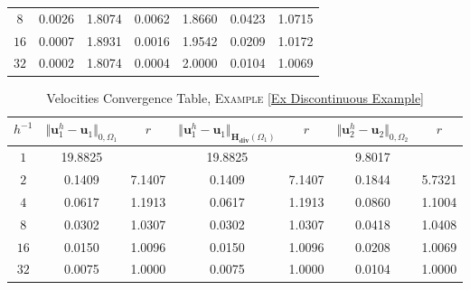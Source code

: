 \documentclass[3p]{elsarticle}
\def\uone{\mathbf{u}_{1}}
\def\utwo{\mathbf{u}_{2}}
\def\Hdiv{\mathbf{H_{div}}}
\begin{document}
\begin{example}
\begin{table}[h!]
\begin{center}
\begin{tabular}{ c c c c c c c }
$ 8 $  &  0.0026  & 1.8074 &  0.0062  & 1.8660    &  0.0423  & 1.0715  \\ 
%
$ 16 $  &  0.0007  & 1.8931 &  0.0016  & 1.9542   &  0.0209 & 1.0172   \\ 
%
$ 32 $  &  0.0002  &  1.8074  &  0.0004  & 2.0000  &  0.0104   & 1.0069  \\ 
%
    \hline
\end{tabular}
\end{center}
%
\end{table}
%
%
\begin{table*}[h!]
\caption{Velocities Convergence Table, \textsc{Example} \ref{Ex Discontinuous Example}}\label{Table Disc Velocity Approximation}
\def\arraystretch{1.4}
\begin{center}
\begin{tabular}{ c c c c c c c }
    \hline
    \rowcolor{gray!50}
$ h^{-1} $  
& $\Vert  \uone^{h}- \uone  \Vert_{ 0, \Omega_{1} } $ 
& $r$  
& $\Vert  \uone^{h}- \uone  \Vert_{\Hdiv(\Omega_{1})}$ 
& $r$
& $\Vert  \utwo^{h}- \utwo  \Vert_{ 0, \Omega_{2} } $ 
& $r$ \\ %
    \toprule
$ 1 $ &   19.8825 & &  19.8825  & &   9.8017  & \\
$ 2 $  &   0.1409  & 7.1407  &  0.1409  & 7.1407  &   0.1844 & 5.7321 \\
$ 4 $ &   0.0617  & 1.1913  &  0.0617  & 1.1913  &  0.0860  & 1.1004 \\
$ 8 $  &  0.0302  & 1.0307  &  0.0302  & 1.0307  &  0.0418 & 1.0408 \\ 
%
$ 16 $  &  0.0150 & 1.0096  &   0.0150  & 1.0096  &  0.0208 & 1.0069 \\ 
%
$ 32 $  &  0.0075  & 1.0000  &  0.0075   & 1.0000 &  0.0104  & 1.0000 \\ 
%
    \hline
\end{tabular}
\end{center}
%
\end{table*}
%
\end{example}
%
%
\end{document}
